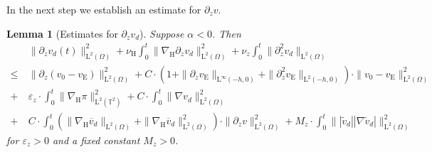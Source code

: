 \documentclass[preprint]{elsarticle}
\newtheorem{lem}[lem]{Lemma}
\numberwithin{equation}{section}
\newcommand {\T}	{\mathbb{T}}
\renewcommand{\d}{\, \mathrm{d}}
\renewcommand{\H}{\mathrm{H}}
\renewcommand{\bar}[1]{\overline{#1}}
\newcommand{\vbar}{\bar{v}}
\newcommand{\vtilde}{\tilde{v}}
\newcommand{\nablaH}{\nabla_{\H}}
\newcommand{\rL}{\mathrm{L}}
\newcommand{\rH}{\H}
\newcommand{\rE}{\mathrm{E}}
\begin{document}
In the next step we establish an estimate for $\partial_z v$. 
\begin{lem}[Estimates for $\partial_z v_d$]\label{lem:estimate vz_2}
	Suppose $\alpha < 0$.  %
	Then
	\begin{equation*}
		\begin{aligned}
			&\| \partial_z v_d(t) \|_{\rL^2(\Omega)}^2 
			+ \nu_{\rH} \int_0^t \| \nablaH \partial_z v_d \|_{\rL^2(\Omega)}^2
			+ \nu_z \int_0^t \| \partial_z^2 v_d \|_{\rL^2(\Omega)} \\ 
			\leq \ &\| \partial_z (v_0 - v_{\rE}) \|_{\rL^2(\Omega)}^2
			+ 
			C \cdot (1 + \| \partial_z v_{\rE} \|_{\rL^\infty(-h,0)} + \| \partial_z^2 v_{\rE} \|_{\rL^2(-h,0)}) \cdot \| v_0 - v_{\rE} \|_{\rL^2(\Omega)}^2 \\
			+ \ &\varepsilon_z \cdot \int_0^t \| \nablaH \pi \|_{\rL^2(\T^2)}^2
			+ C \cdot \int_0^t \| \nabla v_d\|_{\rL^2(\Omega)}^2 \\
			+ \ &C \cdot \int_0^t (\| \nablaH \vbar_d \|_{\rL^2(\Omega)} + \| \nablaH \vbar_d \|_{\rL^2(\Omega)}^2) \cdot \| \partial_z v \|_{\rL^2(\Omega)}^2 %
			+ M_z \cdot \int_0^t \| |\vtilde_d| |\nabla\vtilde_d| \|_{\rL^2(\Omega)}^2  
		\end{aligned}
	\end{equation*}
	for $\varepsilon_z > 0$ and a fixed constant $M_z > 0$.
\end{lem}
\end{document}
